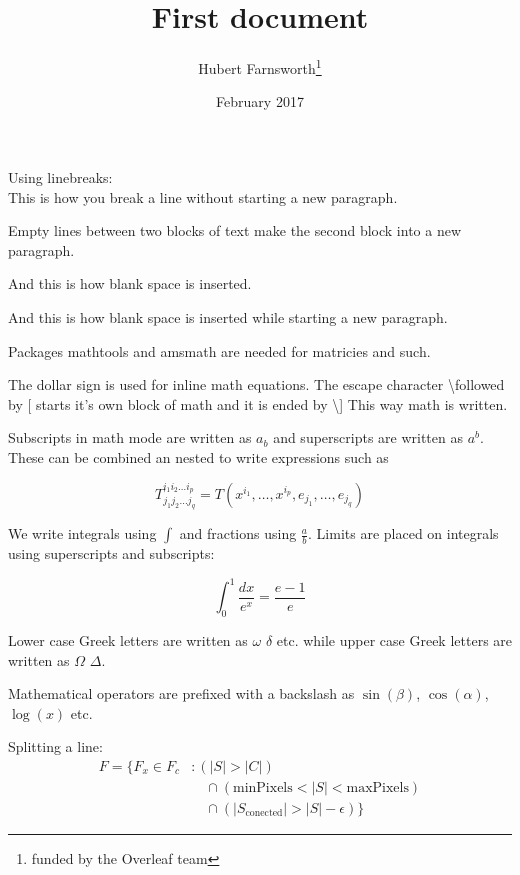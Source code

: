\documentclass[12pt, letterpaper, twoside]{article}    %
\title{First document}
\author{Hubert Farnsworth\thanks{funded by the Overleaf team}}
\date{February 2017}
\begin{document}
\maketitle


Using linebreaks:\\
This is how you break a line without starting a new paragraph.

Empty lines between two blocks of text make the second block into a new paragraph.

\hfill \break
And this is how blank space is inserted.


\hfill \break

And this is how blank space is inserted while starting a new paragraph.




\hfill \break

Packages mathtools and amsmath are needed for matricies and such.


\hfill \break

The dollar sign is used for inline math equations.
The escape character \textbackslash followed by [ starts it's own block of math and it is ended by \textbackslash]    This way math is written.




Subscripts in math mode are written as $a_b$ and superscripts are written as $a^b$. These can be combined an nested to write expressions such as

\[ T^{i_1 i_2 \dots i_p}_{j_1 j_2 \dots j_q} = T(x^{i_1},\dots,x^{i_p},e_{j_1},\dots,e_{j_q}) \]
 
We write integrals using $\int$ and fractions using $\frac{a}{b}$. Limits are placed on integrals using superscripts and subscripts:

\[ \int_0^1 \frac{dx}{e^x} =  \frac{e-1}{e} \]

Lower case Greek letters are written as $\omega$ $\delta$ etc. while upper case Greek letters are written as $\Omega$ $\Delta$.

Mathematical operators are prefixed with a backslash as $\sin(\beta)$, $\cos(\alpha)$, $\log(x)$ etc.


\hfill \break


Splitting a line:
\begin{equation}
\begin{split}
F = \{F_{x} \in  F_{c} &: (|S| > |C|) \\
 &\quad \cap (\text{minPixels}  < |S| < \text{maxPixels}) \\
 &\quad \cap (|S_{\text{conected}}| > |S| - \epsilon) \}
\end{split}
\end{equation}
\end{document}
